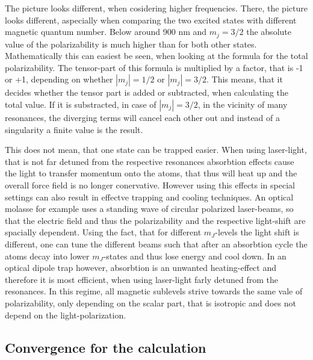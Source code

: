 The picture looks different, when cosidering higher frequencies. There, the picture looks different, aspecially when comparing the two excited states with different magnetic quantum number. Below around 900 nm and $m_j=3/2$ the absolute value of the polarizability is much higher than for both other states. Mathematically this can easiest be seen, when looking at the formula for the total polarizability. The tensor-part of this formula is multiplied by a factor, that is -1 or +1, depending on whether $|m_j|=1/2$ or $|m_j|=3/2$. This means, that it decides whether the tensor part is added or subtracted, when calculating the total value. If it is substracted, in case of $|m_j|=3/2$, in the vicinity of many resonances, the diverging terms will cancel each other out and instead of a singularity a finite value is the result.

This does not mean, that one state can be trapped easier. When using laser-light, that is not far detuned from the respective resonances absorbtion effects cause the light to transfer momentum onto the atoms, that thus will heat up and the overall force field is no longer conervative. However using this effects in special settings can also result in effectve trapping and cooling techniques. An optical molasse for example uses a standing wave of circular polarized laser-beams, so that the electric field and thus the polarizability and the respective light-shift are spacially dependent. Using the fact, that for different $m_J$-levels the light shift is different, one can tune the different beams such that after an absorbtion cycle the atoms decay into lower $m_J$-states and thus lose energy and cool down. In an optical dipole trap however, absorbtion is an unwanted heating-effect and therefore it is most efficient, when using laser-light farly detuned from the resonances. In this regime, all magnetic sublevels strive towards the same vale of polarizability, only depending on the scalar part, that is isotropic and does not depend on the light-polarization.

\subsection{Convergence for the calculation}

